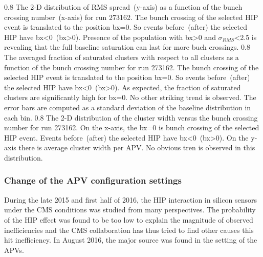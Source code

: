                  {0.8}       %
                 {The 2-D distribution of RMS spread~(y-axis) as a function of the bunch crossing number~(x-axis) for run 273162. The bunch crossing of the selected HIP event is translated to the position bx=0. So events before~(after) the selected HIP have bx<0~(bx>0). Presence of the population with bx>0 and $\sigma_{RMS}$<2.5 is revealing that the full baseline saturation can last for more buch crossings. } %
                 {0.8}       %
                 {The averaged fraction of saturated clusters with respect to all clusters as a function of the bunch crossing  number for run 273162. The bunch crossing of the selected HIP event is translated to the position bx=0. So events before~(after) the selected HIP have bx<0~(bx>0). As expected, the fraction of saturated clusters are significantly high for bx=0. No other striking trend is observed. The error bars are computed as a standard deviation of the baseline distribution in each bin. } %
                 {0.8}       %
                 {The 2-D distribution of the cluster width versus the bunch crossing number for run 273162. On the x-axis, the bx=0 is bunch crossing of the selected HIP event. Events before~(after) the selected HIP have bx<0~(bx>0). On the y-axis there is average cluster width per APV. No obvious tren is observed in this distribution. } %


\subsubsection{Change of the APV configuration settings}

During the late 2015 and first half of 2016, the HIP interaction in silicon sensors under the CMS conditions was studied from many perspectives. The probability of the HIP effect was found to be too low to explain the magnitude of observed inefficiencies and the CMS collaboration has thus tried to find other causes this hit inefficiency. In August 2016, the major source was found in the setting of the APVs.

